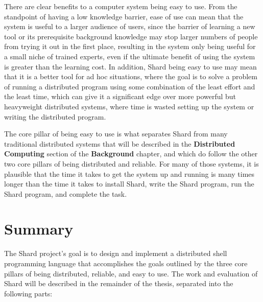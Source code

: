 \documentclass[twoside]{report}
\newcommand{\todoi}[1]{\todo[inline, color=blue!20]{TODO: {#1}}}
\begin{document}
There are clear benefits to a computer system being easy to use.
From the standpoint of having a low knowledge barrier, ease of use can mean that the system is useful to a larger audience of users, since the barrier of learning a new tool or its prerequisite background knowledge may stop larger numbers of people from trying it out in the first place, resulting in the system only being useful for a small niche of trained experts, even if the ultimate benefit of using the system is greater than the learning cost.
In addition, Shard being easy to use may mean that it is a better tool for ad hoc situations, where the goal is to solve a problem of running a distributed program using some combination of the least effort and the least time, which can give it a significant edge over more powerful but heavyweight distributed systems, where time is wasted setting up the system or writing the distributed program.

The core pillar of being easy to use is what separates Shard from many traditional distributed systems that will be described in the \textbf{Distributed Computing} section of the \textbf{Background} chapter, and which do follow the other two core pillars of being distributed and reliable. For many of those systems, it is plausible that the time it takes to get the system up and running is many times longer than the time it takes to install Shard, write the Shard program, run the Shard program, and complete the task.

\section{Summary}


The Shard project's goal is to design and implement a distributed shell programming language that accomplishes the goals outlined by the three core pillars of being distributed, reliable, and easy to use.
The work and evaluation of Shard  will be described in the remainder of the thesis, separated into the following parts:
\end{document}
